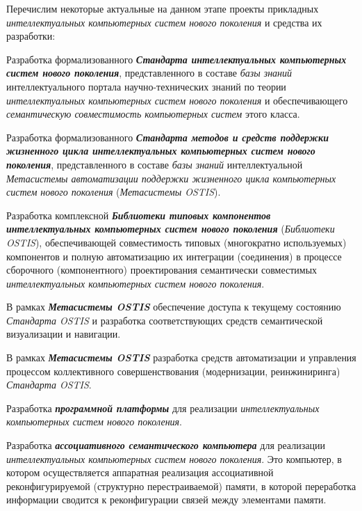 Перечислим некоторые актуальные на данном этапе проекты прикладных \textit{интеллектуальных компьютерных систем нового поколения} и средства их разработки:
\begin{textitemize}
	\item 
	Разработка формализованного \textbf{\textit{Стандарта интеллектуальных компьютерных систем нового поколения}}, представленного в составе \textit{базы знаний} интеллектуального портала научно-технических знаний по теории \textit{интеллектуальных компьютерных систем нового поколения} и обеспечивающего \textit{семантическую совместимость компьютерных систем} этого класса.
	\medskip
	\item 
	Разработка формализованного \textbf{\textit{Стандарта методов и средств поддержки жизненного цикла интеллектуальных компьютерных систем нового поколения}}, представленного в составе \textit{базы знаний} интеллектуальной \textit{Метасистемы автоматизации поддержки жизненного цикла компьютерных систем нового поколения} (\textit{Метасистемы OSTIS}).
	\medskip
	\item 
	Разработка комплексной \textbf{\textit{Библиотеки типовых компонентов интеллектуальных компьютерных систем нового поколения}} (\textit{Библиотеки OSTIS}), обеспечивающей совместимость типовых (многократно используемых) компонентов и полную автоматизацию их интеграции (соединения) в процессе сборочного (компонентного) проектирования семантически совместимых \textit{интеллектуальных компьютерных систем нового поколения}.
	\medskip
	\item 
	В рамках \textbf{\textit{Метасистемы OSTIS}} обеспечение  доступа к текущему состоянию \textit{Стандарта OSTIS} и разработка соответствующих средств семантической визуализации и навигации.
	\medskip
	\item 
	В рамках \textbf{\textit{Метасистемы OSTIS}} разработка средств автоматизации и управления процессом коллективного совершенствования (модернизации, реинжиниринга) \textit{Стандарта OSTIS}.
	\medskip
	\item
	Разработка \textbf{\textit{программной платформы}} для реализации \textit{интеллектуальных компьютерных систем нового поколения}.
	\medskip
	\item 
	Разработка \textbf{\textit{ассоциативного семантического компьютера}} для реализации \textit{интеллектуальных компьютерных систем нового поколения}. Это  компьютер, в котором осуществляется аппаратная реализация ассоциативной реконфигурируемой (структурно перестраиваемой) памяти, в которой переработка информации сводится к реконфигурации связей между элементами памяти.

\end{textitemize}
